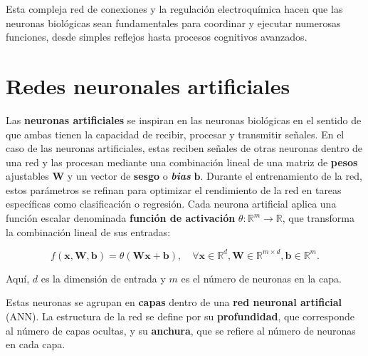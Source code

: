 Esta compleja red de conexiones y la regulación electroquímica hacen que las neuronas biológicas sean fundamentales para coordinar y ejecutar numerosas funciones, desde simples reflejos hasta procesos cognitivos avanzados.

\section{Redes neuronales artificiales}

Las \textbf{neuronas artificiales} se inspiran en las neuronas biológicas en el sentido de que ambas tienen la capacidad de recibir, procesar y transmitir señales. En el caso de las neuronas artificiales, estas reciben señales de otras neuronas dentro de una red y las procesan mediante una combinación lineal de una matriz de \textbf{pesos} ajustables \(\mathbf{W}\) y un vector de \textbf{sesgo} o \textbf{\textit{bias}} \(\mathbf{b}\). Durante el entrenamiento de la red, estos parámetros se refinan para optimizar el rendimiento de la red en tareas específicas como clasificación o regresión. Cada neurona artificial aplica una función escalar denominada \textbf{función de activación} \(\theta: \mathbb{R}^m \to \mathbb{R}\), que transforma la combinación lineal de sus entradas:

\[
f(\mathbf{x}, \mathbf{W}, \mathbf{b}) = \theta(\mathbf{W}\mathbf{x} + \mathbf{b}), \quad \forall \mathbf{x} \in \mathbb{R}^d, \mathbf{W} \in \mathbb{R}^{m \times d}, \mathbf{b} \in \mathbb{R}^m.
\]

Aquí, \(d\) es la dimensión de entrada y \(m\) es el número de neuronas en la capa.

Estas neuronas se agrupan en \textbf{capas} dentro de una \textbf{red neuronal artificial} (ANN). La estructura de la red se define por su \textbf{profundidad}, que corresponde al número de capas ocultas, y su \textbf{anchura}, que se refiere al número de neuronas en cada capa.

